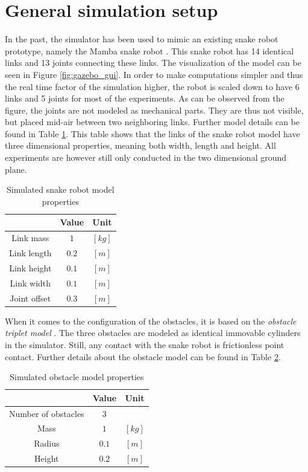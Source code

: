 \section{General simulation setup}\label{sec:simsetup}

In the past, the simulator has been used to mimic an existing snake robot prototype, namely the Mamba snake robot \cite{liljeback2014mamba}. This snake robot has 14 identical links and 13 joints connecting these links. The visualization of the model can be seen in Figure \ref{fig:gazebo_gui}. In order to make computations simpler and thus the real time factor of the simulation higher, the robot is scaled down to have 6 links and 5 joints for most of the experiments. As can be observed from the figure, the joints are not modeled as mechanical parts. They are thus not visible, but placed mid-air between two neighboring links.
Further model details can be found in Table \ref{tab:snake_model_props}. This table shows that the links of the snake robot model have three dimensional properties, meaning both width, length and height. All experiments are however still only conducted in the two dimensional ground plane.

\begin{table}[]
    \centering
    \begin{tabular}{|c|c|c|}
        \hline
        & Value & Unit\\
        \hline
        Link mass & $1$ & $[kg]$ \\
        Link length & $0.2$ & $[m]$ \\
        Link height & $0.1$ & $[m]$ \\
        Link width & $0.1$ & $[m]$ \\
        Joint offset & $0.3$ & $[m]$\\
        \hline
    \end{tabular}
    \caption{Simulated snake robot model properties}
    \label{tab:snake_model_props}
\end{table}

When it comes to the configuration of the obstacles, it is based on the \textit{obstacle triplet model} \cite{sanfilippo2018snakesim}. The three obstacles are modeled as identical immovable cylinders in the simulator. Still, any contact with the snake robot is frictionless point contact. Further details about the obstacle model can be found in Table \ref{tab:obst_model_props}.

\begin{table}[]
    \centering
    \begin{tabular}{|c|c|c|}
        \hline
        & Value & Unit\\
        \hline
        Number of obstacles & $3$ & \\
        Mass & $1$ & $[kg]$ \\
        Radius & $0.1$ & $[m]$ \\
        Height & $0.2$ & $[m]$ \\
        \hline
    \end{tabular}
    \caption{Simulated obstacle model properties}
    \label{tab:obst_model_props}
\end{table}

